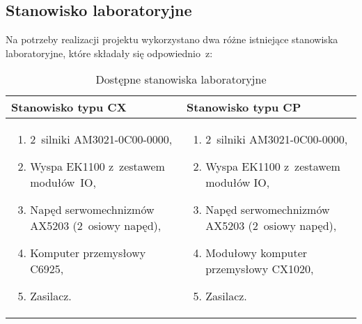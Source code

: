 \subsection{Stanowisko laboratoryjne}
Na potrzeby realizacji projektu wykorzystano dwa różne istniejące stanowiska laboratoryjne, które składały się odpowiednio~z:
\begin{table}[!htb]
\begin{center}
\begin{tabular}{| p{} || p{} |}\hline
Stanowisko typu CX & Stanowisko typu CP   \\\hline
\begin{enumerate}
\item 2~silniki AM3021-0C00-0000,
\item Wyspa EK1100 z~zestawem modułów~IO,
\item Napęd serwomechnizmów AX5203 (2~osiowy napęd),
\item Komputer przemysłowy C6925,
\item Zasilacz.
\end{enumerate}
&
\begin{enumerate}
\item 2~silniki AM3021-0C00-0000,
\item Wyspa EK1100 z~zestawem modułów IO,
\item Napęd serwomechnizmów AX5203 (2~osiowy napęd),
\item Modułowy komputer przemysłowy CX1020,
\item Zasilacz.
\end{enumerate}
\\\hline                                            
\end{tabular}
\end{center}
\vspace*{-6mm}
  \caption{Dostępne stanowiska laboratoryjne}
	\label{in}
\end{table}

